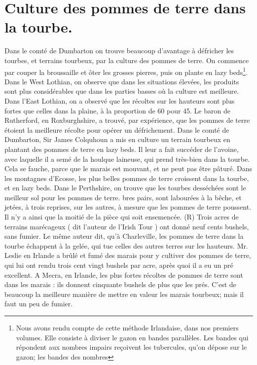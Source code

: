 \section{Culture des pommes de terre dans la tourbe.}
Dans le comté de Dumbarton on trouve beaucoup d'avantage à défricher les tourbes, et terrains tourbeux, par la culture des pommes de terre. On commence par couper la broussaille et ôter les grosses pierres, puis on plante en lazy beds\footnote{Nous avons rendu compte de cette méthode Irlandaise, dans nos premiers volumes. Elle consiste à diviser le gazon en bandes parallèles. Les bandes qui répondent aux nombres impairs reçoivent les tubercules, qu'on dépose sur le gazon; les bandes des nombres}.\setcounter{page}{269} Dans le West Lothian, on observe que dans les situations élevées, les produits sont plus considérables que dans les parties basses où la culture est meilleure. Dans l'East Lothian, on a observé que les récoltes sur les hauteurs sont plus fortes que celles dans la plaine, à la proportion de 60 pour 45.
Le baron de Rutherford, en Roxburghshire, a trouvé, par expérience, que les pommes de terre étoient la meilleure récolte pour opérer un défrichement.
Dans le comté de Dumbarton, Sir James Colquhoun a mis en culture un terrain tourbeux en plantant des pommes de terre en lazy beds. Il leur a fait succéder de l'avoine, avec laquelle il a semé de la houlque laineuse, qui prend très-bien dans la tourbe. Cela se fauche, parce que le marais est mouvant, et ne peut pas être pâturé.
Dans les montagnes d'Ecosse, les plus belles pommes de terre croissent dans la tourbe, et en lazy beds.
Dans le Perthshire, on trouve que les tourbes desséchées sont le meilleur sol pour les pommes de terre.
bres pairs, sont labourées à la bêche, et jetées, à trois reprises, sur les autres, à mesure que les pommes de terre poussent. Il n'y a ainsi que la moitié de la pièce qui soit ensemencée. (R)\setcounter{page}{270} Trois acres de terrains marécageux ( dit l'auteur de l'Irish Tour ) ont donné neuf cents bushels, sans fumier. Le même auteur dit, qu'à Charleville, les pommes de terre dans la tourbe échappent à la gelée, qui tue celles des autres terres sur les hauteurs.
Mr. Leslie en Irlande a brûlé et fumé des marais pour y cultiver des pommes de terre, qui lui ont rendu trois cent vingt bushels par acre, après quoi il a eu un pré excellent.
A Mecra, en Irlande, les plus fortes récoltes de pommes de terre sont dans les marais : ils donnent cinquante bushels de plus que les prés. C'est de beaucoup la meilleure manière de mettre en valeur les marais tourbeux; mais il faut un peu de fumier.
